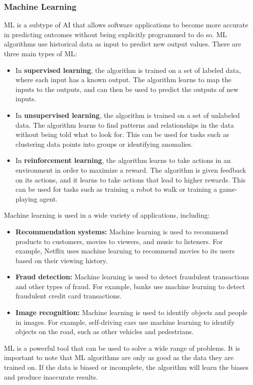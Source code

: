 \subsubsection{Machine Learning}\label{sec: Machine Learning}
\ac{ML} is a subtype of \ac{AI} that allows software applications to become more accurate in predicting outcomes without being explicitly programmed to do so. \ac{ML} algorithms use historical data as input to predict new output values. There are three main types of \ac{ML}\cite{burkov2019hundred}:\\
\begin{itemize}%
	\item In \textbf{supervised learning}, the algorithm is trained on a set of labeled data, where each input has a known output. The algorithm learns to map the inputs to the outputs, and can then be used to predict the outputs of new inputs.
	\item In \textbf{unsupervised learning}, the algorithm is trained on a set of unlabeled data. The algorithm learns to find patterns and relationships in the data without being told what to look for. This can be used for tasks such as clustering data points into groups or identifying anomalies.
	\item In \textbf{reinforcement learning}, the algorithm learns to take actions in an environment in order to maximize a reward. The algorithm is given feedback on its actions, and it learns to take actions that lead to higher rewards. This can be used for tasks such as training a robot to walk or training a game-playing agent.\\
\end{itemize}
Machine learning is used in a wide variety of applications, including:\\
\begin{itemize}%
	\item \textbf{Recommendation systems:} Machine learning is used to recommend products to customers, movies to viewers, and music to listeners. For example, Netflix uses machine learning to recommend movies to its users based on their viewing history.
	\item \textbf{Fraud detection:} Machine learning is used to detect fraudulent transactions and other types of fraud. For example, banks use machine learning to detect fraudulent credit card transactions.
	\item \textbf{Image recognition:} Machine learning is used to identify objects and people in images. For example, self-driving cars use machine learning to identify objects on the road, such as other vehicles and pedestrians.\\
\end{itemize}
\ac{ML} is a powerful tool that can be used to solve a wide range of problems. It is important to note that \ac{ML} algorithms are only as good as the data they are trained on. If the data is biased or incomplete, the algorithm will learn the biases and produce inaccurate results.


